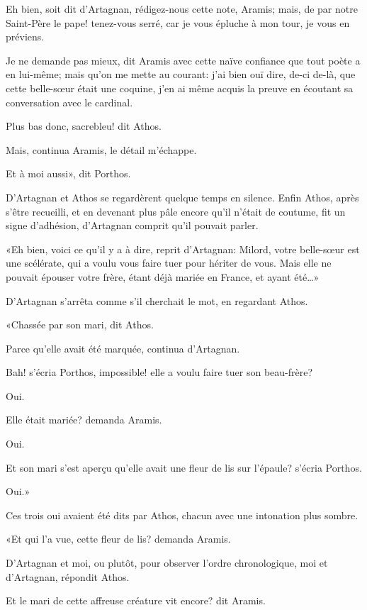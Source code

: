 \speak  Eh bien, soit dit d'Artagnan, rédigez-nous cette note, Aramis; mais, de par notre Saint-Père le pape! tenez-vous serré, car je vous épluche à mon tour, je vous en préviens. 

\speak  Je ne demande pas mieux, dit Aramis avec cette naïve confiance que tout poète a en lui-même; mais qu'on me mette au courant: j'ai bien ouï dire, de-ci de-là, que cette belle-sœur était une coquine, j'en ai même acquis la preuve en écoutant sa conversation avec le cardinal. 

\speak  Plus bas donc, sacrebleu! dit Athos. 

\speak  Mais, continua Aramis, le détail m'échappe. 

\speak  Et à moi aussi», dit Porthos. 

D'Artagnan et Athos se regardèrent quelque temps en silence. Enfin Athos, après s'être recueilli, et en devenant plus pâle encore qu'il n'était de coutume, fit un signe d'adhésion, d'Artagnan comprit qu'il pouvait parler. 

«Eh bien, voici ce qu'il y a à dire, reprit d'Artagnan: Milord, votre belle-sœur est une scélérate, qui a voulu vous faire tuer pour hériter de vous. Mais elle ne pouvait épouser votre frère, étant déjà mariée en France, et ayant été\dots» 

D'Artagnan s'arrêta comme s'il cherchait le mot, en regardant Athos. 

«Chassée par son mari, dit Athos. 

\speak  Parce qu'elle avait été marquée, continua d'Artagnan. 

\speak  Bah! s'écria Porthos, impossible! elle a voulu faire tuer son beau-frère? 

\speak  Oui. 

\speak  Elle était mariée? demanda Aramis. 

\speak  Oui. 

\speak  Et son mari s'est aperçu qu'elle avait une fleur de lis sur l'épaule? s'écria Porthos. 

\speak  Oui.» 

Ces trois oui avaient été dits par Athos, chacun avec une intonation plus sombre. 

«Et qui l'a vue, cette fleur de lis? demanda Aramis. 

\speak  D'Artagnan et moi, ou plutôt, pour observer l'ordre chronologique, moi et d'Artagnan, répondit Athos. 

\speak  Et le mari de cette affreuse créature vit encore? dit Aramis. 


